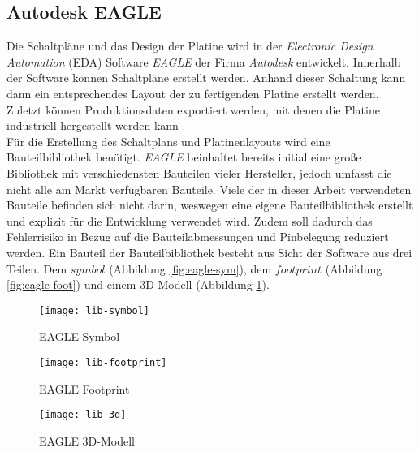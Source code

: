
\subsection{Autodesk EAGLE}
Die Schaltpläne und das Design der Platine wird in der \textit{Electronic Design Automation} (EDA) Software \textit{EAGLE} der Firma \textit{Autodesk} entwickelt. Innerhalb der Software können Schaltpläne erstellt werden. Anhand dieser Schaltung kann dann ein entsprechendes Layout der zu fertigenden Platine erstellt werden. Zuletzt können Produktionsdaten exportiert werden, mit denen die Platine industriell hergestellt werden kann \cite{eagle_homepage}.\\
Für die Erstellung des Schaltplans und Platinenlayouts wird eine Bauteilbibliothek benötigt. \textit{EAGLE} beinhaltet bereits initial eine große Bibliothek mit verschiedensten Bauteilen vieler Hersteller, jedoch umfasst die nicht alle am Markt verfügbaren Bauteile. Viele der in dieser Arbeit verwendeten Bauteile befinden sich nicht darin, weswegen eine eigene Bauteilbibliothek erstellt und explizit für die Entwicklung verwendet wird. Zudem soll dadurch das Fehlerrisiko in Bezug auf die Bauteilabmessungen und Pinbelegung reduziert werden. Ein Bauteil der Bauteilbibliothek besteht aus Sicht der Software aus drei Teilen. Dem $symbol$ (Abbildung \ref{fig:eagle-sym}), dem $footprint$ (Abbildung \ref{fig:eagle-foot}) und einem 3D-Modell (Abbildung \ref{fig:eagle-3d}).
\begin{figure}[h]
	\centering
	\begin{minipage}{.3\linewidth}
		\centering
		\texttt{[image: lib-symbol]}
		\caption{EAGLE Symbol}
		\label{fig:eagle-sym}
	\end{minipage}
	\hfill
	\begin{minipage}{.3\linewidth}
		\centering
		\texttt{[image: lib-footprint]}
		\caption{EAGLE Footprint}
		\label{fig:eagle-foot}
	\end{minipage}
	\hfill
	\begin{minipage}{.3\linewidth}
		\centering
		\texttt{[image: lib-3d]}
		\caption{EAGLE 3D-Modell}
		\label{fig:eagle-3d}
	\end{minipage}
\end{figure}
